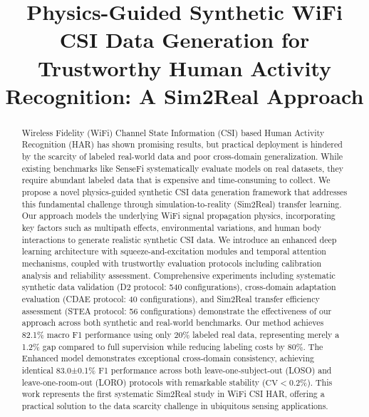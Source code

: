 \documentclass[journal]{IEEEtran}
\begin{document}
\title{Physics-Guided Synthetic WiFi CSI Data Generation for Trustworthy Human Activity Recognition: A Sim2Real Approach}

\author{
}

\maketitle

\begin{abstract}

Wireless Fidelity (WiFi) Channel State Information (CSI) based Human Activity Recognition (HAR) has shown promising results, but practical deployment is hindered by the scarcity of labeled real-world data and poor cross-domain generalization. While existing benchmarks like SenseFi systematically evaluate models on real datasets, they require abundant labeled data that is expensive and time-consuming to collect. We propose a novel physics-guided synthetic CSI data generation framework that addresses this fundamental challenge through simulation-to-reality (Sim2Real) transfer learning. Our approach models the underlying WiFi signal propagation physics, incorporating key factors such as multipath effects, environmental variations, and human body interactions to generate realistic synthetic CSI data. We introduce an enhanced deep learning architecture with squeeze-and-excitation modules and temporal attention mechanisms, coupled with trustworthy evaluation protocols including calibration analysis and reliability assessment. Comprehensive experiments including systematic synthetic data validation (D2 protocol: 540 configurations), cross-domain adaptation evaluation (CDAE protocol: 40 configurations), and Sim2Real transfer efficiency assessment (STEA protocol: 56 configurations) demonstrate the effectiveness of our approach across both synthetic and real-world benchmarks. Our method achieves 82.1\% macro F1 performance using only 20\% labeled real data, representing merely a 1.2\% gap compared to full supervision while reducing labeling costs by 80\%. The Enhanced model demonstrates exceptional cross-domain consistency, achieving identical 83.0±0.1\% F1 performance across both leave-one-subject-out (LOSO) and leave-one-room-out (LORO) protocols with remarkable stability ($\text{CV}<0.2\%$). This work represents the first systematic Sim2Real study in WiFi CSI HAR, offering a practical solution to the data scarcity challenge in ubiquitous sensing applications.
\end{abstract}
\end{document}
